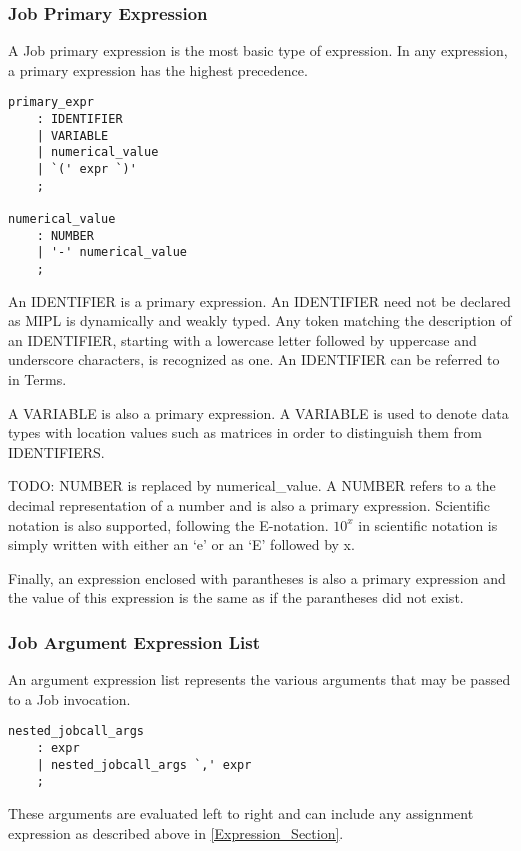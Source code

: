 \documentclass[prodmode,acmtecs]{acmsmall}
\begin{document}
\subsubsection{Job Primary Expression}

A Job primary expression is the most basic type of expression. In any
expression, a primary expression has the highest precedence.

\begin{lstlisting}
primary_expr
	: IDENTIFIER
	| VARIABLE
	| numerical_value
	| `(' expr `)'
	;

numerical_value
	: NUMBER
	| '-' numerical_value
	;
\end{lstlisting}

An IDENTIFIER is a primary expression. An IDENTIFIER need not be declared
as MIPL is dynamically and weakly typed. Any token matching the description
of an IDENTIFIER, starting with a lowercase letter followed by uppercase and
underscore characters, is recognized as one. An IDENTIFIER can be referred to
in Terms.

A VARIABLE is also a primary expression. A VARIABLE is used to denote 
data types with location values such as matrices in order to distinguish them 
from IDENTIFIERS.

TODO: NUMBER is replaced by numerical\_value.
A NUMBER refers to a the decimal representation of a number and is also a 
primary expression. Scientific notation is also supported, following the 
E-notation. $10^{x}$ in scientific notation is simply written with either an
`e' or an `E' followed by x.

Finally, an expression enclosed with parantheses is also a primary expression 
and the value of this expression is the same as if the parantheses did not 
exist.
\medskip

\subsubsection{Job Argument Expression List}

An argument expression list represents the various arguments that may be
passed to a Job invocation. 

\begin{lstlisting}
nested_jobcall_args
	: expr
	| nested_jobcall_args `,' expr
	;
\end{lstlisting}

These arguments are evaluated left to right and can include any assignment 
expression as described above in \ref{Expression_Section}.
\medskip
\end{document}
